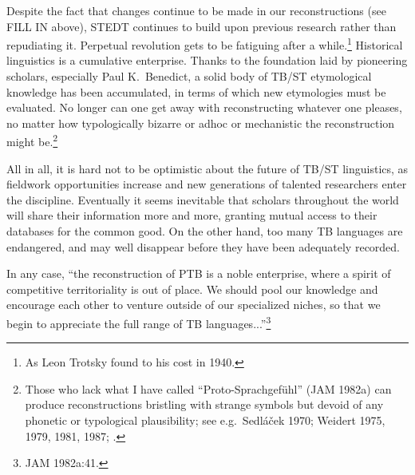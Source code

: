 Despite the fact that changes continue to be made in our reconstructions (see FILL IN above), STEDT continues to build upon previous research rather than repudiating it. 
Perpetual revolution gets to be fatiguing after a while.\footnote{As Leon Trotsky found to his cost in 1940.} Historical linguistics is a cumulative enterprise. Thanks to the foundation laid by pioneering scholars, especially Paul K.\ Benedict, a solid body of TB/ST etymological knowledge has been accumulated, in terms of which new etymologies must be evaluated. No longer can one get away with reconstructing whatever one pleases, no matter how typologically bizarre or adhoc or mechanistic the reconstruction might be.\footnote{Those who lack what I have called “Proto-Sprachgef\"uhl” (JAM 1982a) can produce reconstructions bristling with strange symbols but devoid of any phonetic or typological plausibility; see e.g.\ Sedl\'a\v{c}ek 1970; Weidert 1975, 1979, 1981, 1987; \citealt{PS-STL}.}

All in all, it is hard not to be optimistic about the future of TB/ST linguistics, as fieldwork opportunities increase and new generations of talented researchers enter the discipline. Eventually it seems inevitable that scholars throughout the world will share their information more and more, granting mutual access to their databases for the common good. On the other hand, too many TB languages are endangered, and may well disappear before they have been adequately recorded.

In any case, “the reconstruction of PTB is a noble enterprise, where a spirit of competitive territoriality is out of place. We should pool our knowledge and encourage each other to venture outside of our specialized niches, so that we begin to appreciate the full range of TB languages...”\footnote{JAM 1982a:41.}






